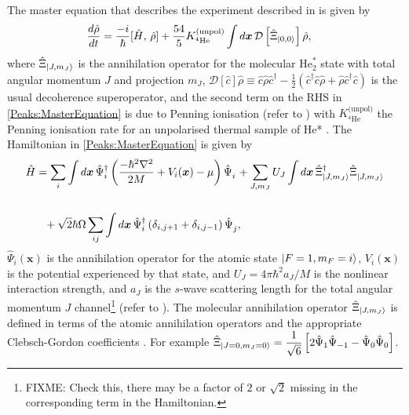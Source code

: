The master equation that describes the experiment described in  is given by
\begin{align}
    \label{Peaks:MasterEquation}
    \frac{d \hat{\rho}}{d t} &= \frac{-i}{\hbar} [\hat{H},\, \hat{\rho} ] + \frac{54}{5} K^\text{(unpol)}_{^{4}\text{He}} \int d \bm{x}\, \mathcal{D}\left[\hat{\Xi}_{\ket{0,0}} \right] \hat{\rho},
\end{align}
where $\displaystyle\hat{\Xi}_{\left|J, m_J\right>}$ is the annihilation operator for the molecular $\displaystyle \text{He}^*_2$ state with total angular momentum $J$ and projection $m_J$, $\mathcal{D}[\hat{c}]\hat{\rho} \equiv \hat{c}\hat{\rho}\hat{c}^\dagger - \frac{1}{2}(\hat{c}^\dagger \hat{c} \hat{\rho} + \hat{\rho} \hat{c}^\dagger \hat{c})$ is the usual decoherence superoperator, and the second term on the RHS in \eqref{Peaks:MasterEquation} is due to Penning ionisation (refer to ) with $K^\text{(unpol)}_{^{4}\text{He}}$ the Penning ionisation rate for an unpolarised thermal sample of He* \citep{Stas:2006kx}. The Hamiltonian in \eqref{Peaks:MasterEquation} is given by
\begin{align}
    \label{Peaks:3DHamiltonian}
    \begin{split}
    \hat{H} &= \sum_i \int d\bm{x}\, \hat{\Psi}_i^\dagger \left(\frac{-\hbar^2 \nabla^2}{2 M} + V_i(\bm{x})- \mu\right)\hat{\Psi}_i^{\phantom{\dagger}} + \sum_{J, m_J} U_{J}\int d\bm{x}\, \hat{\Xi}_\ket{J, m_J}^\dagger \hat{\Xi}_\ket{J, m_J}^{\phantom{\dagger}}\\
    \\
            &\phantom{=} + \sqrt{2} \hbar \Omega \sum_{i j}\int d\bm{x}\, \hat{\Psi}_i^\dagger \left(\delta_{i, j+1} + \delta_{i, j-1}\right) \hat{\Psi}_j^{\phantom{\dagger}},
    \end{split}
\end{align}
$\displaystyle \hat{\Psi}_i(\bm{x})$ is the annihilation operator for the atomic state $\displaystyle {\ensuremath{\left|F=1, m_F=i\right>}}$, $V_i(\bm{x})$ is the potential experienced by that state, and $U_J = 4 \pi \hbar^2 a_J/M$ is the nonlinear interaction strength, and $a_J$ is the $s$-wave scattering length for the total angular momentum $J$ channel\footnote{FIXME: Check this, there may be a factor of $2$ or $\sqrt{2}$ missing in the corresponding term in the Hamiltonian.} (refer to ). The molecular annihilation operator $\displaystyle \hat{\Xi}_{\left|J, m_J\right>}$ is defined in terms of the atomic annihilation operators and the appropriate Clebsch-Gordon coefficients \citep{Ho:1998}. For example $\displaystyle \hat{\Xi}_{\left|J=0, m_J=0\right>} = \frac{1}{\sqrt{6}} \left[ 2 \hat{\Psi}_1 \hat{\Psi}_{-1} - \hat{\Psi}_0 \hat{\Psi}_0\right]$.

